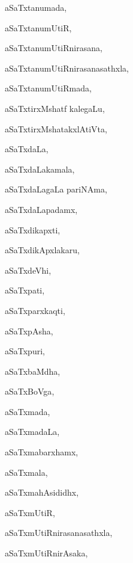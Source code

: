 \begin{multicols}{3}
{\noindent
{aSaTxtanumada}, \pageref{aSaTxtanumada}

\noindent
{aSaTxtanumUtiR}, \pageref{aSaTxtanumUtiR}

\noindent
{aSaTxtanumUtiRnirasana}, \pageref{aSaTxtanumUtiRnirasana}

\noindent
{aSaTxtanumUtiRnirasanasathxla}, \pageref{aSaTxtanumUtiRnirasanasathxla}

\noindent
{aSaTxtanumUtiRmada}, \pageref{aSaTxtanumUtiRmada}

\noindent
{aSaTxtirxMshatf kalegaLu}, \pageref{aSaTxtirxMshatf kalegaLu}

\noindent
{aSaTxtirxMshatakxlAtiVta}, \pageref{aSaTxtirxMshatakxlAtiVta}

\noindent
{aSaTxdaLa}, \pageref{aSaTxdaLa}

\noindent
{aSaTxdaLakamala}, \pageref{aSaTxdaLakamala}

\noindent
{aSaTxdaLagaLa pariNAma}, \pageref{aSaTxdaLagaLa pariNAma}

\noindent
{aSaTxdaLapadamx}, \pageref{aSaTxdaLapadamx}

\noindent
{aSaTxdikapxti}, \pageref{aSaTxdikapxti}

\noindent
{aSaTxdikApxlakaru}, \pageref{aSaTxdikApxlakaru}

\noindent
{aSaTxdeVhi}, \pageref{aSaTxdeVhi}

\noindent
{aSaTxpati}, \pageref{aSaTxpati}

\noindent
{aSaTxparxkaqti}, \pageref{aSaTxparxkaqti}

\noindent
{aSaTxpAsha}, \pageref{aSaTxpAsha}

\noindent
{aSaTxpuri}, \pageref{aSaTxpuri}

\noindent
{aSaTxbaMdha}, \pageref{aSaTxbaMdha}

\noindent
{aSaTxBoVga}, \pageref{aSaTxBoVga}

\noindent
{aSaTxmada}, \pageref{aSaTxmada}

\noindent
{aSaTxmadaLa}, \pageref{aSaTxmadaLa}

\noindent
{aSaTxmabarxhamx}, \pageref{aSaTxmabarxhamx}

\noindent
{aSaTxmala}, \pageref{aSaTxmala}

\noindent
{aSaTxmahAsididhx}, \pageref{aSaTxmahAsididhx}

\noindent
{aSaTxmUtiR}, \pageref{aSaTxmUtiR}

\noindent
{aSaTxmUtiRnirasanasathxla}, \pageref{aSaTxmUtiRnirasanasathxla}

\noindent
{aSaTxmUtiRnirAsaka}, \pageref{aSaTxmUtiRnirAsaka}

}
\end{multicols}

